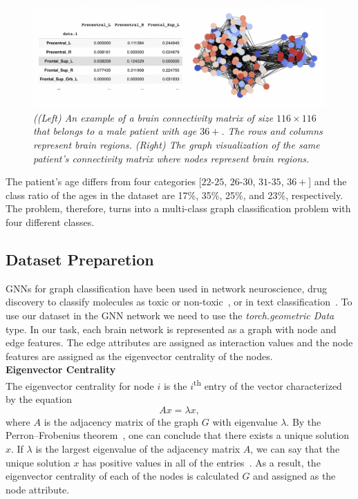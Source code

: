 \documentclass[runningheads]{llncs}
\begin{document}
%
\begin{figure}[!h]
  \centering
  \includegraphics[width=12cm]{images/Fig1.png}
  \caption{\textit{((Left) An example of a brain connectivity matrix of size $116\times 116$ that belongs to a male patient with age $36+$. The rows and columns represent brain regions. (Right) The graph visualization of the same patient's connectivity matrix where nodes represent brain regions.}}
  \label{fig1}
\end{figure}
%
The patient's age differs from four categories [$22$-$25$, $26$-$30$, $31$-$35$, $36+$] and the class ratio of the ages in the dataset are 17\%, 35\%, 25\%, and 23\%, respectively. The problem, therefore, turns into a multi-class graph classification problem with four different classes. 
\subsection{Dataset Preparetion}
GNNs for graph classification have been used in network neuroscience\cite{bessadok2022graph}, drug discovery to classify molecules as toxic or non-toxic~\cite{wieder2020compact}, or in text classification~\cite{huang2019text}. To use our dataset in the GNN network we need to use the \emph{torch.geometric Data} type. 
In our task, each brain network is represented as a graph with node and edge features. The edge attributes are assigned as interaction values and the node features are assigned as the eigenvector centrality of the nodes.\\

\textbf{Eigenvector Centrality}\\
 The eigenvector centrality for node 
$i$ is the $i$\textsuperscript{th} entry of the vector characterized by the equation
 \[ Ax = \lambda x, \]
where 
$A$ is the adjacency matrix of the graph $G$ with eigenvalue $\lambda$. By the Perron–Frobenius theorem~\cite{bonacich1987power}, one can conclude that there exists a unique solution 
$x$. If $\lambda$ is the largest eigenvalue of the adjacency matrix $A$, we can say that the unique solution $x$ has positive values in all of the entries~\cite{brede2012networks}. As a result, the eigenvector centrality of each of the nodes is calculated $G$ and assigned as the node attribute. 
\end{document}

